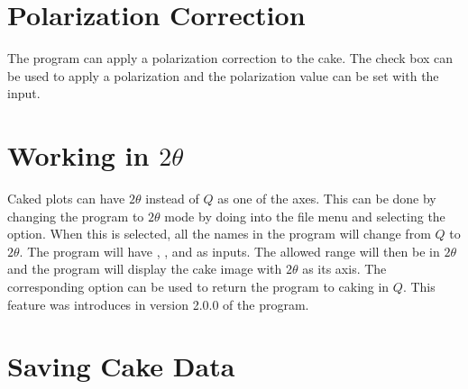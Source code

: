 \section{Polarization Correction}
The program can apply a polarization correction to the
cake. The  check box
can be used to apply a polarization and the 
polarization value can be set with the  input.

\section{\texorpdfstring{Working in $2\theta$}{Working in 2theta}}

Caked plots can have $2\theta$ instead of $Q$ as one
of the axes.  This can be done by changing the program
to $2\theta$ mode by doing into the file menu and selecting 
the  option. When this is selected,
all the names in the program will change from $Q$ to $2\theta$. 
The program will have , , 
and  as inputs. The allowed range will
then be in $2\theta$ and the program will display the cake image with
$2\theta$ as its axis. The corresponding  option 
can be used to return the program to caking in $Q$.
This feature was introduces in version 2.0.0 of the program.

\section{Saving Cake Data}

